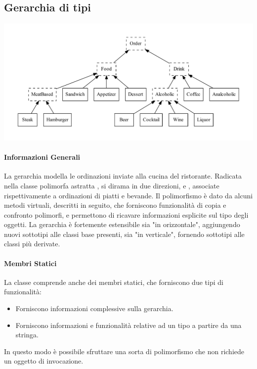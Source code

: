 \subsection{Gerarchia di tipi} %
\label{sub:gerarchia_di_tipi}
\includegraphics[width=\linewidth]{gerarchia.pdf}
\paragraph{Informazioni Generali} %
\label{par:informazioni_generali}
La gerarchia modella le ordinazioni inviate alla cucina del ristorante. Radicata nella classe polimorfa astratta , si dirama in due direzioni,  e , associate rispettivamente a ordinazioni di piatti e bevande. Il polimorfismo è dato da alcuni metodi virtuali, descritti in seguito, che forniscono funzionalità di copia e confronto polimorfi, e permettono di ricavare informazioni esplicite sul tipo degli oggetti. La gerarchia è fortemente estensibile sia "in orizzontale", aggiungendo nuovi sottotipi alle classi base presenti, sia "in verticale", fornendo sottotipi alle classi più derivate.
\paragraph{Membri Statici} %
\label{par:membri_statici}
La classe  comprende anche dei membri statici, che forniscono due tipi di funzionalità:
\begin{itemize}
	\item Forniscono informazioni complessive sulla gerarchia.
	\item Forniscono informazioni e funzionalità relative ad un tipo a partire da una stringa.
\end{itemize}
In questo modo è possibile sfruttare una sorta di polimorfismo che non richiede un oggetto di invocazione.
